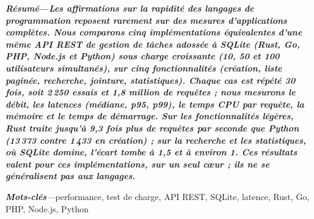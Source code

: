 \noindent\textbf{\textit{Résumé}---}\textbf{\textit{Les affirmations sur la rapidité des langages de programmation
reposent rarement sur des mesures d'applications complètes. Nous comparons cinq implémentations équivalentes d'une
même API REST de gestion de tâches adossée à SQLite (Rust, Go, PHP, Node.js et Python) sous charge croissante (10, 50
et 100 utilisateurs simultanés), sur cinq fonctionnalités (création, liste paginée, recherche, jointure, statistiques).
Chaque cas est répété 30 fois, soit 2\,250 essais et 1,8 million de requêtes ; nous mesurons le débit, les latences
(médiane, p95, p99), le temps CPU par requête, la mémoire et le temps de démarrage. Sur les fonctionnalités légères,
Rust traite jusqu'à 9,3 fois plus de requêtes par seconde que Python (13\,373 contre 1\,433 en création) ; sur la
recherche et les statistiques, où SQLite domine, l'écart tombe à 1,5 et à environ 1. Ces résultats valent pour ces
implémentations, sur un seul cœur ; ils ne se généralisent pas aux langages.}}

\smallskip
\noindent\textit{\textbf{Mots-clés}---}performance, test de charge, API REST, SQLite, latence, Rust, Go, PHP, Node.js,
Python
